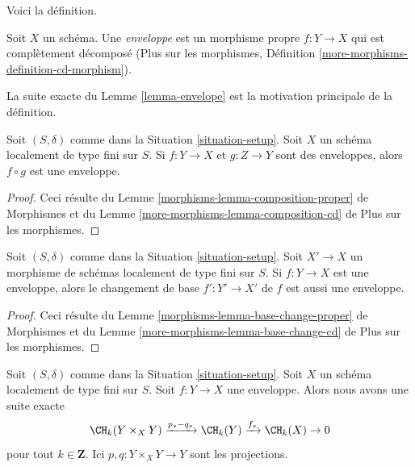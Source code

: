 \noindent
Voici la définition.

\begin{definition}
\label{definition-envelope}
\begin{reference}
\cite[Definition 18.3]{F}
\end{reference}
Soit $X$ un schéma. Une {\it enveloppe} est un morphisme propre $f : Y \to X$
qui est complètement décomposé
(Plus sur les morphismes, Définition \ref{more-morphisms-definition-cd-morphism}).
\end{definition}

\noindent
La suite exacte du Lemme \ref{lemma-envelope}
est la motivation principale de la définition.

\begin{lemma}
\label{lemma-composition-envelope}
Soit $(S, \delta)$ comme dans la Situation \ref{situation-setup}.
Soit $X$ un schéma localement de type fini sur $S$.
Si $f : Y \to X$ et $g : Z \to Y$ sont des enveloppes, alors
$f \circ g$ est une enveloppe.
\end{lemma}

\begin{proof}
Ceci résulte du Lemme \ref{morphisms-lemma-composition-proper} de Morphismes
et du Lemme \ref{more-morphisms-lemma-composition-cd} de Plus sur les morphismes.
\end{proof}

\begin{lemma}
\label{lemma-base-change-envelope}
Soit $(S, \delta)$ comme dans la Situation \ref{situation-setup}.
Soit $X' \to X$ un morphisme de schémas localement de type fini sur $S$.
Si $f : Y \to X$ est une enveloppe, alors le changement de base $f' : Y' \to X'$
de $f$ est aussi une enveloppe.
\end{lemma}

\begin{proof}
Ceci résulte du Lemme \ref{morphisms-lemma-base-change-proper} de Morphismes
et du Lemme \ref{more-morphisms-lemma-base-change-cd} de Plus sur les morphismes.
\end{proof}

\begin{lemma}
\label{lemma-envelope}
Soit $(S, \delta)$ comme dans la Situation \ref{situation-setup}.
Soit $X$ un schéma localement de type fini sur $S$.
Soit $f : Y \to X$ une enveloppe. Alors
nous avons une suite exacte
$$
\CH_k(Y \times_X Y) \xrightarrow{p_* - q_*}
\CH_k(Y) \xrightarrow{f_*}
\CH_k(X) \to 0
$$
pour tout $k \in \mathbf{Z}$. Ici $p, q : Y \times_X Y \to Y$ sont
les projections.
\end{lemma}

